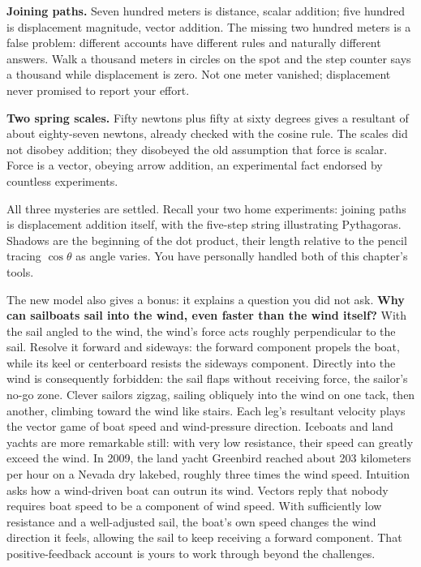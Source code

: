 \textbf{Joining paths.} Seven hundred meters is distance, scalar addition; five hundred is displacement magnitude, vector addition. The missing two hundred meters is a false problem: different accounts have different rules and naturally different answers. Walk a thousand meters in circles on the spot and the step counter says a thousand while displacement is zero. Not one meter vanished; displacement never promised to report your effort.

\textbf{Two spring scales.} Fifty newtons plus fifty at sixty degrees gives a resultant of about eighty-seven newtons, already checked with the cosine rule. The scales did not disobey addition; they disobeyed the old assumption that force is scalar. Force is a vector, obeying arrow addition, an experimental fact endorsed by countless experiments.

All three mysteries are settled. Recall your two home experiments: joining paths is displacement addition itself, with the five-step string illustrating Pythagoras. Shadows are the beginning of the dot product, their length relative to the pencil tracing \(\cos\theta\) as angle varies. You have personally handled both of this chapter's tools.

The new model also gives a bonus: it explains a question you did not ask. \textbf{Why can sailboats sail into the wind, even faster than the wind itself?} With the sail angled to the wind, the wind's force acts roughly perpendicular to the sail. Resolve it forward and sideways: the forward component propels the boat, while its keel or centerboard resists the sideways component. Directly into the wind is consequently forbidden: the sail flaps without receiving force, the sailor's no-go zone. Clever sailors zigzag, sailing obliquely into the wind on one tack, then another, climbing toward the wind like stairs. Each leg's resultant velocity plays the vector game of boat speed and wind-pressure direction. Iceboats and land yachts are more remarkable still: with very low resistance, their speed can greatly exceed the wind. In 2009, the land yacht Greenbird reached about 203 kilometers per hour on a Nevada dry lakebed, roughly three times the wind speed. Intuition asks how a wind-driven boat can outrun its wind. Vectors reply that nobody requires boat speed to be a component of wind speed. With sufficiently low resistance and a well-adjusted sail, the boat's own speed changes the wind direction it feels, allowing the sail to keep receiving a forward component. That positive-feedback account is yours to work through beyond the challenges.

